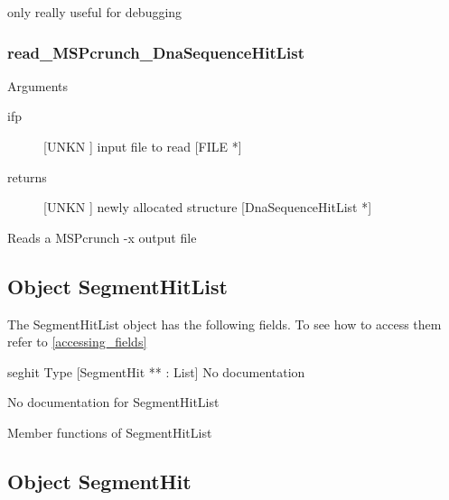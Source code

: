 only really useful for debugging


\subsubsection{read_MSPcrunch_DnaSequenceHitList}

Arguments
\begin{description}
\item[ifp] [UNKN ] input file to read [FILE *]
\item[returns] [UNKN ] newly allocated structure [DnaSequenceHitList *]
\end{description}
Reads a MSPcrunch -x output file 


\subsection{Object SegmentHitList}

\label{object_SegmentHitList}

The SegmentHitList object has the following fields. To see how to access them refer to \ref{accessing_fields}
\begin{description}
\item{seghit} Type [SegmentHit ** : List] No documentation

\end{description}
No documentation for SegmentHitList

Member functions of SegmentHitList

\subsection{Object SegmentHit}

\label{object_SegmentHit}

